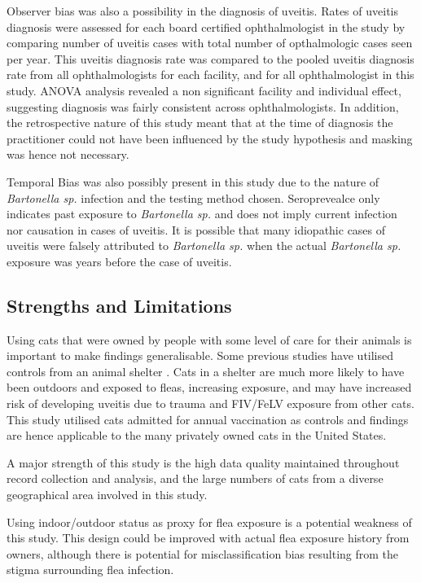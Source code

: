\documentclass[11pt,twocolumn]{article}
\begin{document}
		Observer bias was also a possibility in the diagnosis of uveitis.
		Rates of uveitis diagnosis were assessed for each board certified ophthalmologist in the study by comparing number of uveitis cases with total number of opthalmologic cases seen per year. This uveitis diagnosis rate was compared to the pooled uveitis diagnosis rate from all ophthalmologists for each facility, and for all ophthalmologist in this study.
		ANOVA analysis revealed a non significant facility and individual effect, suggesting diagnosis was fairly consistent across ophthalmologists.
		In addition, the retrospective nature of this study meant that at the time of diagnosis the practitioner could not have been influenced by the study hypothesis and masking was hence not necessary. 


		Temporal Bias was also possibly present in this study due to the nature of \emph{Bartonella sp.} infection and the testing method chosen. 
		Seroprevealce only indicates past exposure to \emph{Bartonella sp.} and does not imply current infection nor causation in cases of uveitis.
		It is possible that many idiopathic cases of uveitis were falsely attributed to \emph{Bartonella sp.} when the actual \emph{Bartonella sp.} exposure was years before the case of uveitis.


	\subsection{Strengths and Limitations}
		Using cats that were owned by people with  some level of care for their animals is important to make findings generalisable.
		Some previous studies have utilised controls from an animal shelter \cite{Lappin2000,Powell2010}. Cats in a shelter are much more likely to have been outdoors and exposed to fleas, increasing exposure, and may have increased risk of developing uveitis due to trauma and FIV/FeLV exposure from other cats.
		This study utilised cats admitted for annual vaccination as controls and findings are hence applicable to the many privately owned cats in the United States.

		A major strength of this study is the high data quality maintained throughout record collection and analysis, and the large numbers of cats from a diverse geographical area involved in this study.


		Using indoor/outdoor status as proxy for flea exposure is a potential weakness of this study. 
		This design could be improved with actual flea exposure history from owners, although there is potential for misclassification bias resulting from the stigma surrounding flea infection.
		
\end{document}
